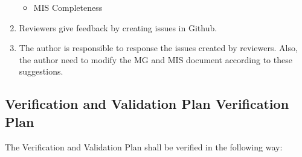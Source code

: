 \documentclass[12pt, titlepage]{article}
\begin{document}
\begin{enumerate}
\begin{itemize}
    \item MIS Completeness

\end{itemize}

\item Reviewers give feedback by creating issues in Github. 

\item The author is responsible to response the issues created by reviewers. Also, the author need to modify the MG and MIS document according to these suggestions. 

\end{enumerate}


\subsection{Verification and Validation Plan Verification Plan}
\label{verification_validation_plan_verification_plan}
The Verification and Validation Plan shall be verified in the following way: 
\end{document}
